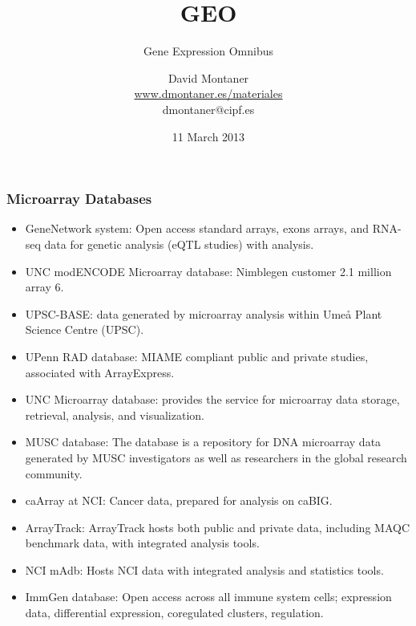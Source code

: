 \documentclass{beamer}
\title{GEO}
\date{11 March 2013}
\subtitle{Gene Expression Omnibus}
\author{David Montaner \\ 
  \href{http://www.dmontaner.es/materiales}{www.dmontaner.es/materiales} \\ 
  dmontaner@cipf.es}
\begin{document}
\begin{frame}
  \maketitle
\end{frame}




\begin{frame}[allowframebreaks]
  \frametitle{Microarray Databases}

  \begin{itemize}
  \item GeneNetwork system: Open access standard arrays, exons arrays, and RNA-seq data for genetic analysis (eQTL studies) with analysis.
  \item UNC modENCODE Microarray database: Nimblegen customer 2.1 million array 6.
  \item UPSC-BASE: data generated by microarray analysis within Umeå Plant Science Centre (UPSC).
  \item UPenn RAD database: MIAME compliant public and private studies, associated with ArrayExpress.
  \item UNC Microarray database: provides the service for microarray data storage, retrieval, analysis, and visualization.

    \framebreak

  \item MUSC database: The database is a repository for DNA microarray data generated by MUSC investigators as well as researchers in the global research community.
  \item caArray at NCI: Cancer data, prepared for analysis on caBIG.
  \item ArrayTrack: ArrayTrack hosts both public and private data, including MAQC benchmark data, with integrated analysis tools.
  \item NCI mAdb: Hosts NCI data with integrated analysis and statistics tools.
  \item ImmGen database: Open access across all immune system cells; expression data, differential expression, coregulated clusters, regulation.


\end{itemize}
\end{frame}
\end{document}
